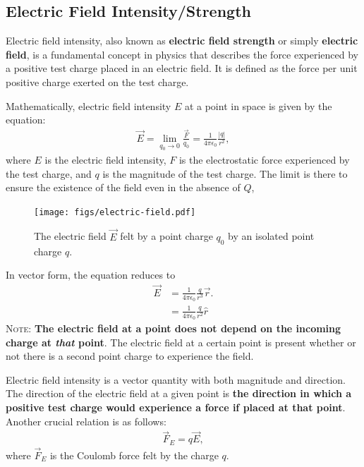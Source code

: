 \documentclass[12pt,b4paper]{article}
\begin{document}
\subsection{Electric Field Intensity/Strength}
Electric field intensity, also known as \textbf{electric field strength} or simply \textbf{electric field}, is a fundamental concept in physics that describes the force experienced by a positive test charge placed in an electric field. It is defined as the force per unit positive charge exerted on the test charge.

Mathematically, electric field intensity $E$ at a point in space is given by the equation:
\begin{align}
    \vec{E}=\lim_{q_0\to 0}\frac{\vec{F}}{q_0}=\frac{1}{4\pi\epsilon_0}\frac{|q|}{r^2},
\end{align}
where $E$ is the electric field intensity, $F$ is the electrostatic force experienced by the test charge, and $q$ is the magnitude of the test charge. The limit is there to ensure the existence of the field even in the absence of $Q$,
\begin{figure}[H]
    \centering
    \texttt{[image: figs/electric-field.pdf]}
    \caption{The electric field $\vec{E}$ felt by a point charge $q_0$ by an isolated point charge $q$.}
    \label{fig:coulomb-force}
\end{figure}
In vector form, the equation reduces to
\begin{align}
    \Vec{E}&=\frac{1}{4\pi\epsilon_0}\frac{q}{r^3}\Vec{r}.\\
    &=\frac{1}{4\pi\epsilon_0}\frac{q}{r^2}\hat{r}
\end{align}
\textsc{Note}:\textbf{ The electric field at a point does not depend on the incoming charge at \textit{that} point}. The electric field at a certain point is present whether or not there is a second point charge to experience the field.

Electric field intensity is a vector quantity with both magnitude and direction. The direction of the electric field at a given point is \textbf{the direction in which a positive test charge would experience a force if placed at that point}.
Another crucial relation is as follows:
\begin{align}
    \vec{F}_E=q\vec{E},
\end{align}
where $\Vec{F}_E$ is the Coulomb force felt by the charge $q$.
\end{document}

